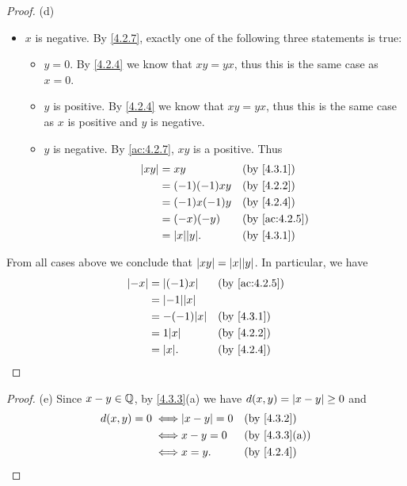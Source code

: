 \begin{proof}{(d)}
\begin{itemize}
\begin{itemize}
          \end{itemize}
    \item \(x\) is negative.
          By \cref{4.2.7}, exactly one of the following three statements is true:
          \begin{itemize}
            \item \(y = 0\).
                  By \cref{4.2.4} we know that \(xy = yx\), thus this is the same case as \(x = 0\).
            \item \(y\) is positive.
                  By \cref{4.2.4} we know that \(xy = yx\), thus this is the same case as \(x\) is positive and \(y\) is negative.
            \item \(y\) is negative.
                  By \cref{ac:4.2.7}, \(xy\) is a positive.
                  Thus
                  \begin{align*}
                    \abs{xy} & = xy               &  & \by{4.3.1}    \\
                             & = (-1)(-1)xy       &  & \by{4.2.2}    \\
                             & = (-1)x(-1)y       &  & \by{4.2.4}    \\
                             & = (-x)(-y)         &  & \by{ac:4.2.5} \\
                             & = \abs{x} \abs{y}. &  & \by{4.3.1}
                  \end{align*}
          \end{itemize}
  \end{itemize}
  From all cases above we conclude that \(\abs{xy} = \abs{x} \abs{y}\).
  In particular, we have
  \begin{align*}
    \abs{-x} & = \abs{(-1)x}      &  & \by{ac:4.2.5} \\
             & = \abs{-1} \abs{x}                    \\
             & = -(-1) \abs{x}    &  & \by{4.3.1}    \\
             & = 1 \abs{x}        &  & \by{4.2.2}    \\
             & = \abs{x}.         &  & \by{4.2.4}
  \end{align*}
\end{proof}

\begin{proof}{(e)}
  Since \(x - y \in \mathbb{Q}\), by \cref{4.3.3}(a) we have \(d(x, y) = \left\lvert x - y\right\rvert \geq 0\) and
  \begin{align*}
    d(x, y) = 0
    \iff & \abs{x - y} = 0 &  & \by{4.3.2}                  \\
    \iff & x - y = 0       &  & \text{(by \cref{4.3.3}(a))} \\
    \iff & x = y.          &  & \by{4.2.4}
  \end{align*}
\end{proof}

